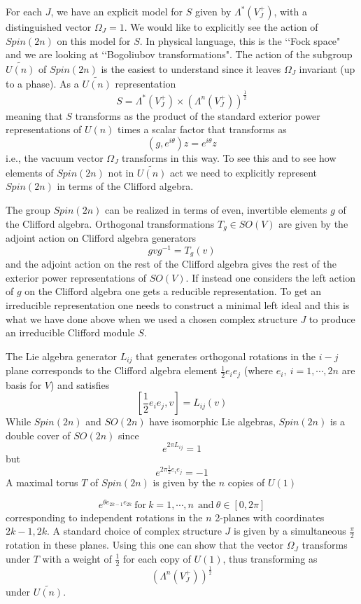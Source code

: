 \documentclass[a4paper,a4paper]{article}
\theoremstyle{conjecture}
\begin{document}
For each $J$, we have an explicit model for $S$ given by
$\Lambda^*(V^+_J)$, with a distinguished vector $\Omega_J=1$. We
would like to explicitly see the action of $Spin(2n)$ on this
model for $S$.  In physical language, this is the \lq\lq Fock
space" and we are looking at \lq\lq Bogoliubov transformations".
The action of the subgroup $\widetilde{U(n)}$ of $Spin(2n)$ is the
easiest to understand since it leaves $\Omega_J$ invariant (up to
a phase).  As a $\widetilde{U(n)}$ representation
$$S=\Lambda^*(V^+_J)\times (\Lambda^{n}(V^+_J))^{\frac{1}{2}}$$
meaning that $S$ transforms as the product of the standard
exterior power representations of $U(n)$ times a scalar factor
that transforms as
$$ (g,e^{i\theta})z=e^{i\theta}z$$
i.e., the vacuum vector $\Omega_J$ transforms in this way. To see
this and to see how elements of $Spin(2n)$ not in
$\widetilde{U(n)}$ act we need to explicitly represent $Spin(2n)$
in terms of the Clifford algebra.

The group $Spin(2n)$ can be realized in terms of even, invertible
elements $g$ of the Clifford algebra.  Orthogonal transformations
$T_g\in SO(V)$ are given by the adjoint action on Clifford algebra
generators
$$gvg^{-1}=T_g(v)$$
and the adjoint action on the rest of the Clifford algebra gives
the rest of the exterior power representations of $SO(V)$.
If instead one considers the left action of $g$ on the Clifford
algebra one gets a reducible representation.  To get an irreducible
representation one needs to construct a minimal left ideal and
this is what we have done above when we used a chosen complex
structure $J$ to produce an irreducible Clifford module $S$.

The Lie algebra generator $L_{ij}$ that generates orthogonal rotations
in the $i-j$ plane corresponds to the Clifford algebra element
$\frac{1}{2}e_ie_j$ (where $e_i,\ i=1,\cdots,2n$ are basis for $V$) and satisfies
$$[\frac{1}{2}e_ie_j,v] = L_{ij}(v)$$
While $Spin(2n)$ and $SO(2n)$ have isomorphic Lie algebras, $Spin(2n)$ is
a double cover of $SO(2n)$ since
$$e^{2\pi L_{ij}}=1$$
but
$$e^{2\pi\frac{1}{2}e_ie_j} = -1$$
A maximal torus $T$ of $Spin(2n)$ is given by the $n$ copies of $U(1)$

$$ e^{\theta e_{2k-1}e_{2k}} \ \text{for} \ k=1,\cdots,n\ \ \text{and} \ \theta\in [0,2\pi]$$
corresponding to independent rotations in the $n$ 2-planes with coordinates $2k-1,2k$.
A standard choice of complex structure $J$ is given by a simultaneous $\frac{\pi}{2}$ rotation
in these planes. Using this one can show that the vector $\Omega_J$ transforms under $T$
with a weight of $\frac{1}{2}$ for each copy of $U(1)$, thus transforming as
$$(\Lambda^{n}(V^+_J))^{\frac{1}{2}}$$
under $\widetilde{U(n)}$.
\end{document}

